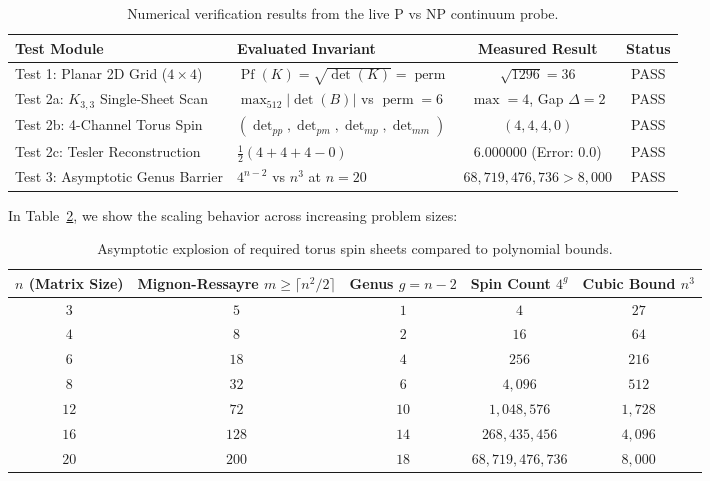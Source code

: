 \documentclass[11pt,a4paper]{article}
\theoremstyle{definition}
\begin{document}
\begin{table}[h]
\centering
\small
\begin{tabular}{llcc}
\toprule
\textbf{Test Module} & \textbf{Evaluated Invariant} & \textbf{Measured Result} & \textbf{Status} \\
\midrule
Test 1: Planar 2D Grid ($4 \times 4$) & $\operatorname{Pf}(K) = \sqrt{\det(K)} = \operatorname{perm}$ & $\sqrt{1296} = 36$ & PASS \\
Test 2a: $K_{3,3}$ Single-Sheet Scan & $\max_{512} |\det(B)|$ vs $\operatorname{perm} = 6$ & $\max = 4$, Gap $\Delta = 2$ & PASS \\
Test 2b: 4-Channel Torus Spin & $(\det_{pp}, \det_{pm}, \det_{mp}, \det_{mm})$ & $(4, 4, 4, 0)$ & PASS \\
Test 2c: Tesler Reconstruction & $\frac{1}{2}(4 + 4 + 4 - 0)$ & $6.000000$ (Error: $0.0$) & PASS \\
Test 3: Asymptotic Genus Barrier & $4^{n-2}$ vs $n^3$ at $n=20$ & $68,719,476,736 > 8,000$ & PASS \\
\bottomrule
\end{tabular}
\caption{Numerical verification results from the live P vs NP continuum probe.}
\label{tab:p_vs_np_probe}
\end{table}

In Table~\ref{tab:asymptotic_table}, we show the scaling behavior across increasing problem sizes:

\begin{table}[h]
\centering
\small
\begin{tabular}{ccccc}
\toprule
$n$ (Matrix Size) & Mignon-Ressayre $m \ge \lceil n^2/2 \rceil$ & Genus $g = n - 2$ & Spin Count $4^g$ & Cubic Bound $n^3$ \\
\midrule
$3$ & $5$ & $1$ & $4$ & $27$ \\
$4$ & $8$ & $2$ & $16$ & $64$ \\
$6$ & $18$ & $4$ & $256$ & $216$ \\
$8$ & $32$ & $6$ & $4,096$ & $512$ \\
$12$ & $72$ & $10$ & $1,048,576$ & $1,728$ \\
$16$ & $128$ & $14$ & $268,435,456$ & $4,096$ \\
$20$ & $200$ & $18$ & $68,719,476,736$ & $8,000$ \\
\bottomrule
\end{tabular}
\caption{Asymptotic explosion of required torus spin sheets compared to polynomial bounds.}
\label{tab:asymptotic_table}
\end{table}
\end{document}
